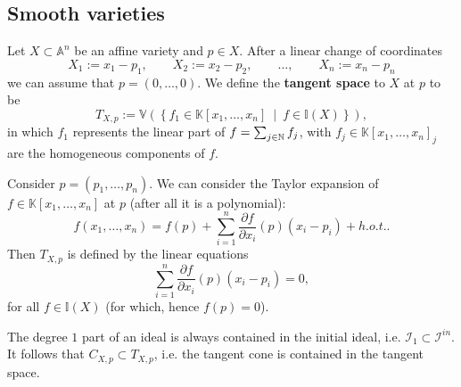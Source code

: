 \subsection{Smooth varieties}
\begin{defn}
	Let $X \subset \mathbb{A}^{n}$ be an affine variety and $p \in X$.
	After a linear change of coordinates
	\begin{equation}
	X_1 := x_1 - p_1, \qquad X_2 := x_2 - p_2, \qquad \ldots, \qquad
	X_n := x_n - p_n
	\end{equation} 
	we can assume that $p = \left( 0, \ldots, 0 \right)$.
	We define the \textbf{tangent space} to $X$ at $p$ to be
	\begin{equation}
	T_{X,p} := \mathbb{V}\left( \left\{ f_1 \in \mathbb{K}\left[x_1, \ldots, x_n \right] \ \middle|\ 
	f \in \mathbb{I}(X)\right\} \right)
	,\end{equation} 
	in which $f_1$ represents the linear part of $f = \sum_{j \in \mathbb{N}}^{} f_j$, with
	$f_j \in \mathbb{K}\left[x_1, \ldots, x_n \right]_j$ are the homogeneous components of $f$.
\end{defn}

\begin{rem}[]
	Consider $p = \left( p_1, \ldots, p_n \right)$.
	We can consider the Taylor expansion of $f \in \mathbb{K}\left[x_1, \ldots, x_n \right]$ at $p$
	(after all it is a polynomial):
	\begin{equation}
		f \left( x_1, \ldots, x_n \right) =
		f(p) + \sum_{i=1}^{n} \frac{\partial f}{\partial x_i} (p) \left( x_i - p_i \right) +
		h.o.t.
	.\end{equation} 
	Then $T_{X,p}$ is defined by the linear equations
	\begin{equation}
		\sum_{i=1}^{n} \frac{\partial f}{\partial x_i} (p) \left( x_i - p_i \right) = 0
	,\end{equation} 
	for all $f \in \mathbb{I}(X)$ (for which, hence $f(p) = 0$).
\end{rem}

\begin{rem}[]
	The degree $1$ part of an ideal is always contained in the initial ideal,
	i.e. $\mathcal{I}_1 \subset \mathcal{I}^{in}$.
	It follows that $C_{X,p} \subset T_{X, p}$, i.e. the tangent cone is contained in the tangent space.
\end{rem}
 
